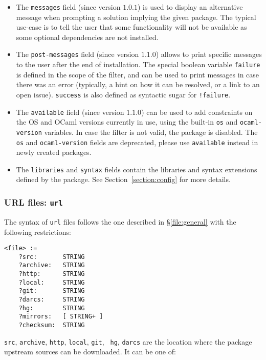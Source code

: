 \documentclass[a4paper,10pt]{article}
\begin{document}
\begin{itemize}
\item The {\tt messages} field (since version $1.0.1$) is used to
  display an alternative message when prompting a solution implying
  the given package. The typical use-case is to tell the user that
  some functionality will not be available as some optional
  dependencies are not installed.

\item The {\tt post-messages} field (since version $1.1.0$) allows to print
  specific messages to the user after the end of installation. The special
  boolean variable \verb+failure+ is defined in the scope of the filter, and can
  be used to print messages in case there was an error (typically, a hint on how
  it can be resolved, or a link to an open issue). \verb+success+ is also
  defined as syntactic sugar for \verb+!failure+.

\item The {\tt available} field (since version $1.1.0$) can be used to add
  constraints on the OS and OCaml versions currently in use, using the built-in
  \verb+os+ and \verb+ocaml-version+ variables. In case the filter is not valid,
  the package is disabled. The {\tt os} and {\tt ocaml-version} fields are
  deprecated, please use {\tt available} instead in newly created packages.

\item The {\tt libraries} and {\tt syntax} fields contain the
  libraries and syntax extensions defined by the package. See
  Section~\ref{section:config} for more details.

\end{itemize}

\subsubsection{URL files: {\tt url}}
\label{file:url}

The syntax of {\tt url} files follows the one described in
\S\ref{file:general} with the following restrictions:

{
\begin{Verbatim}[frame=single]
<file> :=
    ?src:       STRING
    ?archive:   STRING
    ?http:      STRING
    ?local:     STRING
    ?git:       STRING
    ?darcs:     STRING
    ?hg:        STRING
    ?mirrors:   [ STRING+ ]
    ?checksum:  STRING
\end{Verbatim}
}

{\tt src}, {\tt archive}, {\tt http}, {\tt local}, {\tt git}, {\tt
  hg}, {\tt darcs} are the location where the package upstream sources
can be downloaded. It can be one of:
\end{document}
